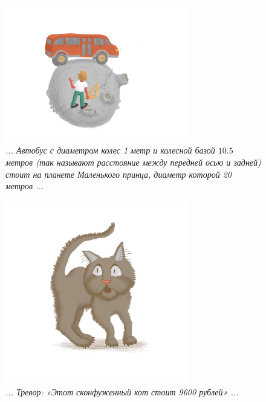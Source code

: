 \documentclass[10pt]{scrbook} \usepackage{modules/nonstahp_book}
\begin{document}
\begin{figure} \begin{center}
	\includegraphics[width=8cm]{figures/color/14}
	\caption{
             {\itshape ... Автобус с диаметром колес 1 метр и колесной базой $10.5$ метров 
             (так называют расстояние между передней осью и задней) стоит на планете Маленького 
             принца, диаметр которой 20 метров ...}\\
             }
\end{center} \end{figure}

\begin{figure} \begin{center}
	\includegraphics[width=8cm]{figures/color/16}
	\caption{
             {\itshape ... Тревор: «Этот сконфуженный кот стоит 9600 рублей» ...}\\
             }
\end{center} \end{figure}
\end{document}
